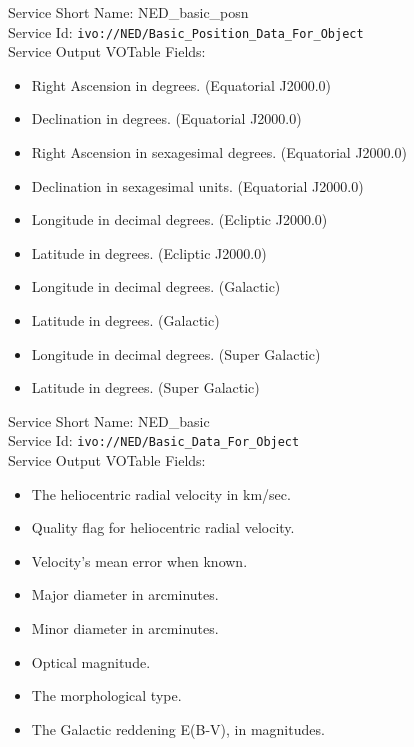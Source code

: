 \documentclass{aa}
\begin{document}
\begin{minipage}[h]{0.99\columnwidth}
  \small \vspace{\baselineskip}
  \noindent Service Short Name: NED\_basic\_posn\\
  Service Id: \texttt{ivo://NED/Basic\_Position\_Data\_For\_Object}\\
  Service Output VOTable Fields:
  \begin{itemize}
	  \item Right Ascension in degrees. (Equatorial J2000.0)
	  \item Declination in degrees. (Equatorial J2000.0)
	  \item Right Ascension in sexagesimal degrees. (Equatorial J2000.0)
	  \item Declination in sexagesimal units. (Equatorial J2000.0)
	  \item Longitude in decimal degrees. (Ecliptic J2000.0)
	  \item Latitude in degrees. (Ecliptic J2000.0)
	  \item Longitude in decimal degrees. (Galactic)
	  \item Latitude in degrees. (Galactic)
	  \item Longitude in decimal degrees. (Super Galactic)
	  \item Latitude in degrees. (Super Galactic)
  \end{itemize}
\end{minipage}

\begin{minipage}[h]{0.99\columnwidth}
  \small \vspace{\baselineskip}
  \noindent Service Short Name: NED\_basic\\
Service Id: \texttt{ivo://NED/Basic\_Data\_For\_Object}\\
Service Output VOTable Fields:
\begin{itemize}
\item The heliocentric radial velocity in km/sec.
\item Quality flag for heliocentric radial velocity.
\item Velocity's mean error when known.
\item Major diameter in arcminutes.
\item Minor diameter in arcminutes.
\item Optical magnitude.
\item The morphological type.
\item The Galactic reddening E(B-V), in magnitudes.
\end{itemize}
\vspace{\baselineskip}
\end{minipage}
\end{document}
